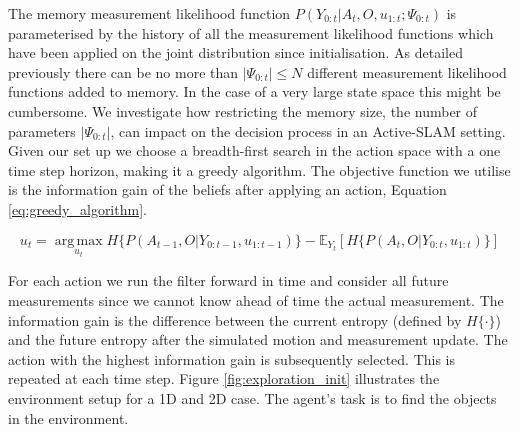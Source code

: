 The memory measurement likelihood function $P(Y_{0:t}|A_t,O,u_{1:t};\Psi_{0:t})$ is parameterised by the 
history of all the measurement likelihood functions which have been applied on the joint 
distribution since initialisation. As detailed previously there can be no more than $|\Psi_{0:t}| \leq N$ different measurement likelihood functions added to 
memory. In the case of a very large state space this might be cumbersome. We investigate how restricting the memory size, the number 
of parameters $|\Psi_{0:t}|$, can impact on the decision process in an Active-SLAM setting. Given our set up we choose a breadth-first search in the action 
space with a one time step horizon, making it a greedy algorithm. The objective function we utilise is the information
gain of the beliefs after applying an action, Equation \ref{eq:greedy_algorithm}.

\begin{equation}\label{eq:greedy_algorithm}
 u_{t} = \operatorname*{arg\,max}_{u_t} H\{P(A_{t-1},O|Y_{0:t-1},u_{1:t-1})\} - \mathbb{E}_{Y_t}\left[H\{P(A_{t},O|Y_{0:t},u_{1:t})\}\right]
\end{equation}

For each action we run the filter forward in time and consider all future measurements since we cannot know ahead of time the actual 
measurement. The information gain is the difference between the current entropy (defined 
by $H\{\cdot\}$) and the future entropy after the simulated motion and measurement update. The action with the highest information gain 
is subsequently selected. This is repeated at each time step. Figure \ref{fig:exploration_init} illustrates the environment setup for 
a 1D and 2D case. The agent's task is to find the objects in the environment.


